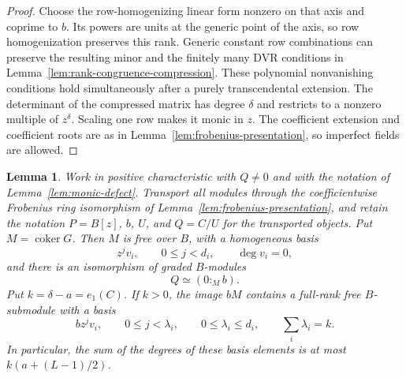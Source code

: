 \documentclass[12pt]{amsart}
\numberwithin{equation}{section}
\newtheorem{lemma}[theorem]{Lemma}
\theoremstyle{definition}
\theoremstyle{remark}
\numberwithin{equation}{section}
\begin{document}
\begin{proof}
Choose the row-homogenizing linear form nonzero on that axis and coprime to $b$. Its powers are units at the generic point of the axis, so row homogenization preserves this rank. Generic constant row combinations can preserve the resulting minor and the finitely many DVR conditions in Lemma~\ref{lem:rank-congruence-compression}. These polynomial nonvanishing conditions hold simultaneously after a purely transcendental extension. The determinant of the compressed matrix has degree $\delta$ and restricts to a nonzero multiple of $z^\delta$. Scaling one row makes it monic in $z$.
The coefficient extension and coefficient roots are as in Lemma~\ref{lem:frobenius-presentation}, so imperfect fields are allowed.
\end{proof}

\begin{lemma}\label{lem:tor-krylov}
Work in positive characteristic with $Q\ne0$ and with the notation of Lemma~\ref{lem:monic-defect}. Transport all modules through the coefficientwise Frobenius ring isomorphism of Lemma~\ref{lem:frobenius-presentation}, and retain the notation $P=B[z]$, $b$, $U$, and $Q=C/U$ for the transported objects. Put $M=\operatorname{coker}G$. Then $M$ is free over $B$, with a homogeneous basis
\[
 z^jv_i,\qquad 0\le j<d_i,\qquad \deg v_i=0,
\]
and there is an isomorphism of graded $B$-modules
\[
 Q\simeq(0:_M b).
\]
Put $k=\delta-a=e_1(C)$. If $k>0$, the image $bM$ contains a full-rank free $B$-submodule with a basis
\[
 bz^jv_i,\qquad 0\le j<\lambda_i,\qquad
 0\le\lambda_i\le d_i,\qquad \sum_i\lambda_i=k.
\]
In particular, the sum of the degrees of these basis elements is at most $k(a+(L-1)/2)$.
\end{lemma}
\end{document}
